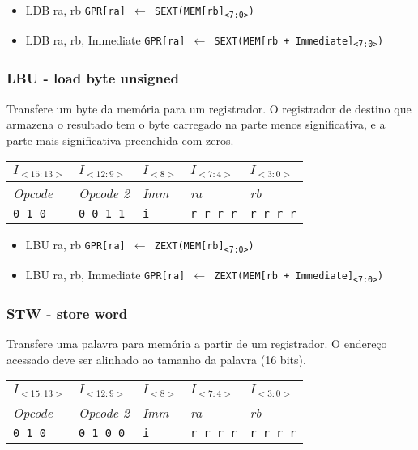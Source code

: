 \documentclass[11pt,a4paper]{report}
\begin{document}
\begin{itemize}
\item LDB ra, rb
\subitem \texttt{GPR[ra] $\leftarrow$ SEXT(MEM[rb]\textsubscript{<7:0>})}
\item LDB ra, rb, Immediate
\subitem \texttt{GPR[ra] $\leftarrow$ SEXT(MEM[rb + Immediate]\textsubscript{<7:0>})}
\end{itemize}

\subsubsection{LBU - load byte unsigned}

Transfere um byte da memória para um registrador. O registrador de
destino que armazena o resultado tem o byte carregado na parte menos
significativa, e a parte mais significativa preenchida com zeros.

\begin{table}[htb!]
\centering
\begin{tabular}{|p{2cm}|p{2cm}|p{2cm}|p{2cm}|p{2cm}|}
\hline
$I_{<15:13>}$ & $I_{<12:9>}$ & $I_{<8>}$ & $I_{<7:4>}$ & $I_{<3:0>}$  \\ \hline
\textit{Opcode} & \textit{Opcode 2} & \textit{Imm} & \textit{ra} & \textit{rb} \\ \hline
\texttt{0 1 0} & \texttt{0 0 1 1} & \texttt{i} & \texttt{r r r r} & \texttt{r r r r} \\ \hline
\end{tabular}
\end{table}

\begin{itemize}
\item LBU ra, rb
\subitem \texttt{GPR[ra] $\leftarrow$ ZEXT(MEM[rb]\textsubscript{<7:0>})}
\item LBU ra, rb, Immediate
\subitem \texttt{GPR[ra] $\leftarrow$ ZEXT(MEM[rb + Immediate]\textsubscript{<7:0>})}
\end{itemize}

\subsubsection{STW - store word}

Transfere uma palavra para memória a partir de um registrador. O endereço
acessado deve ser alinhado ao tamanho da palavra (16 bits).

\begin{table}[htb!]
\centering
\begin{tabular}{|p{2cm}|p{2cm}|p{2cm}|p{2cm}|p{2cm}|}
\hline
$I_{<15:13>}$ & $I_{<12:9>}$ & $I_{<8>}$ & $I_{<7:4>}$ & $I_{<3:0>}$  \\ \hline
\textit{Opcode} & \textit{Opcode 2} & \textit{Imm} & \textit{ra} & \textit{rb} \\ \hline
\texttt{0 1 0} & \texttt{0 1 0 0} & \texttt{i} & \texttt{r r r r} & \texttt{r r r r} \\ \hline
\end{tabular}
\end{table}
\end{document}
